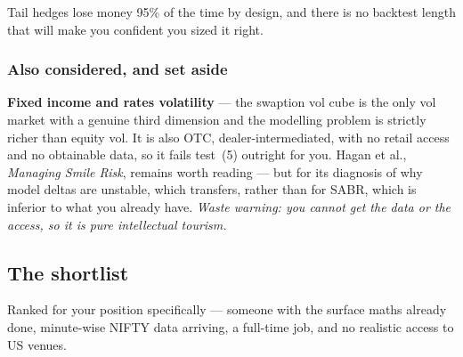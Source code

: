 \documentclass[11pt,a4paper]{article}
\begin{document}
\begin{waste}
Tail hedges lose money 95\% of the time by design, and there is no backtest
length that will make you confident you sized it right.
\end{waste}

\subsubsection{Also considered, and set aside}
\textbf{Fixed income and rates volatility} --- the swaption vol cube is the only
vol market with a genuine third dimension and the modelling problem is strictly
richer than equity vol. It is also OTC, dealer-intermediated, with no retail
access and no obtainable data, so it fails test~(5) outright for you. Hagan et
al., \emph{Managing Smile Risk}, remains worth reading --- but for its diagnosis
of why model deltas are unstable, which transfers, rather than for SABR, which
is inferior to what you already have. \textit{Waste warning: you cannot get the
data or the access, so it is pure intellectual tourism.}

\subsection{The shortlist}

Ranked for your position specifically --- someone with the surface maths already
done, minute-wise NIFTY data arriving, a full-time job, and no realistic access
to US venues.
\end{document}
